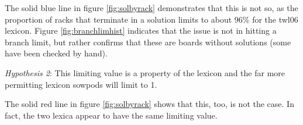 \documentclass[twocolumn]{revtex4}
\begin{document}
The solid blue line in figure \ref{fig:solbyrack} demonstrates that this is not so, as the proportion of racks that terminate in a solution limits to about 96\% for the twl06 lexicon. Figure \ref{fig:branchlimhist} indicates that the issue is not in hitting a branch limit, but rather confirms that these are boards without solutions (some have been checked by hand).

\emph{Hypothesis 2}: This limiting value is a property of the lexicon and the far more permitting lexicon sowpods will limit to 1.

The solid red line in figure \ref{fig:solbyrack} shows that this, too, is not the case. In fact, the two lexica appear to have the same limiting value.
\end{document}
